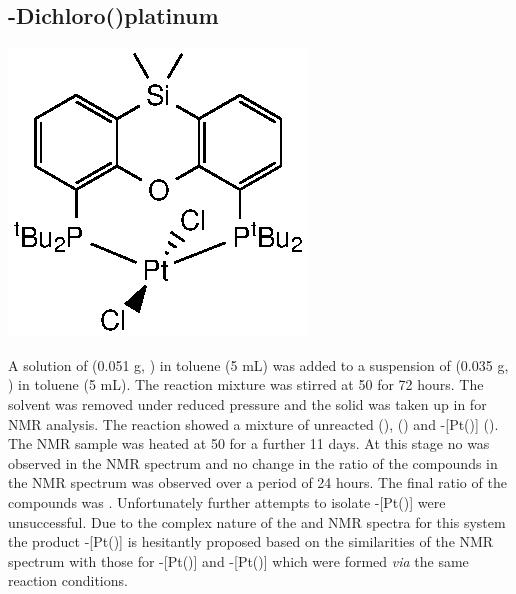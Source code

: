 \subsection*{\trans-Dichloro(\tBusixantphos)platinum}
\begin{structure}[h]
\begin{center}
\includegraphics{../Structures/SitBuPtCl2.eps}
\end{center}
\end{structure}

A solution of \tBusixantphos{} (0.051 g, ) in toluene (5 mL) was added to a suspension of  (0.035 g, ) in toluene (5 mL).  The reaction mixture was stirred at 50 \degC{} for 72 hours.  The solvent was removed under reduced pressure and the solid was taken up in  for NMR analysis.  The reaction showed a mixture  of unreacted \tBusixantphos{} (), \tBusixantphos {} () and \trans-[Pt(\tBusixantphos)] ().  The NMR sample was heated at 50 \degC for a further 11 days.  At this stage no  was observed in the \proton{} NMR spectrum and no change in the ratio of the compounds in the \phosphorus{} NMR spectrum was observed over a period of 24 hours.  The final ratio of the compounds was .  Unfortunately further attempts to isolate \trans-[Pt(\tBusixantphos)] were unsuccessful.  Due to the complex nature of the \proton{} and \carbon{} NMR spectra for this system the product \trans-[Pt(\tBusixantphos)] is hesitantly proposed based on the similarities of the \phosphorus{} NMR spectrum with those for \trans-[Pt(\tButhixantphos)] and \trans-[Pt(\tBuxantphos)] which were formed \emph{via} the same reaction conditions. 

